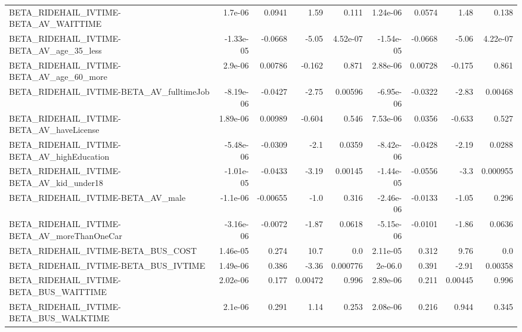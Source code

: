 \begin{tabular}{lrrrrrrrr}
BETA\_RIDEHAIL\_IVTIME-BETA\_AV\_WAITTIME              &     1.7e-06 &       0.0941 &     1.59 &    0.111 &   1.24e-06 &      0.0574 &         1.48 &         0.138 \\
BETA\_RIDEHAIL\_IVTIME-BETA\_AV\_age\_35\_less           &   -1.33e-05 &      -0.0668 &    -5.05 & 4.52e-07 &  -1.54e-05 &     -0.0668 &        -5.06 &      4.22e-07 \\
BETA\_RIDEHAIL\_IVTIME-BETA\_AV\_age\_60\_more           &     2.9e-06 &      0.00786 &   -0.162 &    0.871 &   2.88e-06 &     0.00728 &       -0.175 &         0.861 \\
BETA\_RIDEHAIL\_IVTIME-BETA\_AV\_fulltimeJob           &   -8.19e-06 &      -0.0427 &    -2.75 &  0.00596 &  -6.95e-06 &     -0.0322 &        -2.83 &       0.00468 \\
BETA\_RIDEHAIL\_IVTIME-BETA\_AV\_haveLicense           &    1.89e-06 &      0.00989 &   -0.604 &    0.546 &   7.53e-06 &      0.0356 &       -0.633 &         0.527 \\
BETA\_RIDEHAIL\_IVTIME-BETA\_AV\_highEducation         &   -5.48e-06 &      -0.0309 &     -2.1 &   0.0359 &  -8.42e-06 &     -0.0428 &        -2.19 &        0.0288 \\
BETA\_RIDEHAIL\_IVTIME-BETA\_AV\_kid\_under18           &   -1.01e-05 &      -0.0433 &    -3.19 &  0.00145 &  -1.44e-05 &     -0.0556 &         -3.3 &      0.000955 \\
BETA\_RIDEHAIL\_IVTIME-BETA\_AV\_male                  &    -1.1e-06 &     -0.00655 &     -1.0 &    0.316 &  -2.46e-06 &     -0.0133 &        -1.05 &         0.296 \\
BETA\_RIDEHAIL\_IVTIME-BETA\_AV\_moreThanOneCar        &   -3.16e-06 &      -0.0072 &    -1.87 &   0.0618 &  -5.15e-06 &     -0.0101 &        -1.86 &        0.0636 \\
BETA\_RIDEHAIL\_IVTIME-BETA\_BUS\_COST                 &    1.46e-05 &        0.274 &     10.7 &      0.0 &   2.11e-05 &       0.312 &         9.76 &           0.0 \\
BETA\_RIDEHAIL\_IVTIME-BETA\_BUS\_IVTIME               &    1.49e-06 &        0.386 &    -3.36 & 0.000776 &    2e-06.0 &       0.391 &        -2.91 &       0.00358 \\
BETA\_RIDEHAIL\_IVTIME-BETA\_BUS\_WAITTIME             &    2.02e-06 &        0.177 &  0.00472 &    0.996 &   2.89e-06 &       0.211 &      0.00445 &         0.996 \\
BETA\_RIDEHAIL\_IVTIME-BETA\_BUS\_WALKTIME             &     2.1e-06 &        0.291 &     1.14 &    0.253 &   2.08e-06 &       0.216 &        0.944 &         0.345 \\

\end{tabular}
